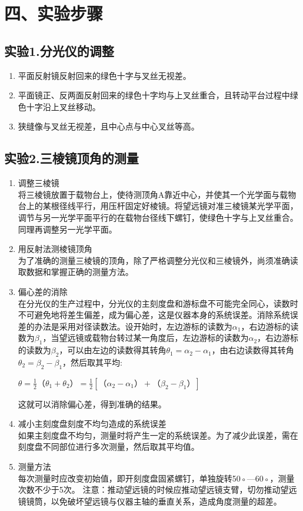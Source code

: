 \documentclass[11pt,a4paper,oneside]{article}
\begin{document}
\section*{四、实验步骤}
\subsection*{实验1.分光仪的调整}
\begin{enumerate}
\item 平面反射镜反射回来的绿色十字与叉丝无视差。
\item 平面镜正、反两面反射回来的绿色十字均与上叉丝重合，且转动平台过程中绿色十字沿上叉丝移动。
\item 狭缝像与叉丝无视差，且中心点与中心叉丝等高。
\end{enumerate}


\subsection*{实验2.三棱镜顶角的测量}
\begin{enumerate}
\item 调整三棱镜\\
将三棱镜放置于载物台上，使待测顶角A靠近中心，并使其一个光学面与载物台上的某根径线平行，用压杆固定好棱镜。将望远镜对准三棱镜某光学平面，调节与另一光学平面平行的在载物台径线下螺钉，使绿色十字与上叉丝重合。同理再调整另一光学平面。
\item 用反射法测棱镜顶角\\
为了准确的测量三棱镜的顶角，除了严格调整分光仪和三棱镜外，尚须准确读取数据和掌握正确的测量方法。
\item 偏心差的消除\\
在分光仪的生产过程中，分光仪的主刻度盘和游标盘不可能完全同心，读数时不可避免地将差生偏差，成为偏心差，这是仪器本身的系统误差。消除系统误差的办法是采用对径读数法。设开始时，左边游标的读数为$\alpha_1$，右边游标的读数为$\beta_1$，当望远镜或载物台转过某一角度后，左边游标的读数为$\alpha_2$，右边游标的读数为$\beta_2$，可以由左边的读数得其转角${\theta_1}={\alpha_2}-{\alpha_1}$，由右边读数得其转角${\theta_2}={\beta_2}-{\beta_1}$，然后取其平均:
\begin{center}
$\theta=\displaystyle\frac{1}{2}（{\theta_1}+{\theta_2}）=\displaystyle\frac{1}{2}[（{\alpha_2}-{\alpha_1}）+（{\beta_2}-{\beta_1}）]$
\end{center}
这就可以消除偏心差，得到准确的结果。
\item 减小主刻度盘刻度不均匀造成的系统误差\\
   如果主刻度盘不均匀，测量时将产生一定的系统误差。为了减少此误差，需在刻度盘不同部位进行多次测量，然后取其平均值。
\item 测量方法\\
每次测量时应改变初始值，即开刻度盘固紧螺钉，单独旋转50◦—60◦，测量次数不少于5次。
注意：推动望远镜的时候应推动望远镜支臂，切勿推动望远镜镜筒，以免破坏望远镜与仪器主轴的垂直关系，造成角度测量的超差。
\end{enumerate}
\end{document}
